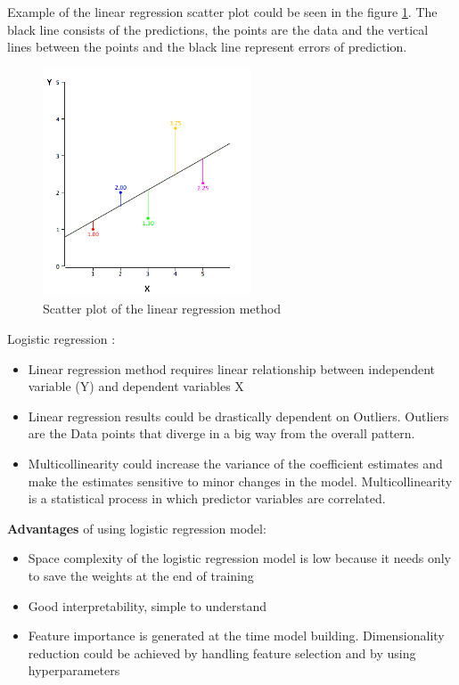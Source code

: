 \begin{enumerate}
    Example of the linear regression scatter plot could be seen in the figure \ref{fig:linear_regression}. The black line consists of the predictions, the points are the data and the vertical lines between the points and  the black line represent errors of prediction.
    \begin{figure}[H]
        \centering
        \includegraphics[width=0.55\textwidth]{Pictures/linear_regression.png}
        \caption{\label{fig:linear_regression}{}Scatter plot of the linear regression method \cite{BIB17}}
    \end{figure}
    
    
    Logistic regression :
    
    \begin{itemize}
        \item Linear regression method requires linear relationship between independent variable (Y) and dependent variables X
        \item Linear regression results could be drastically dependent on Outliers. Outliers are the Data points that diverge in a big way from the overall pattern. 
        \item Multicollinearity could increase the variance of the coefficient estimates and make the estimates sensitive to minor changes in the model. Multicollinearity is a statistical process in which predictor variables are correlated.
    \end{itemize}
    
    \textbf{Advantages} of using logistic regression model:
    
    \begin{itemize}
        \item Space complexity of the logistic regression model is low because it needs only to save the weights at the end of training
        \item Good interpretability, simple to understand
        \item Feature importance is generated at the time model building. Dimensionality reduction could be achieved by handling feature selection and by using hyperparameters 
    \end{itemize}
    

\end{enumerate}
